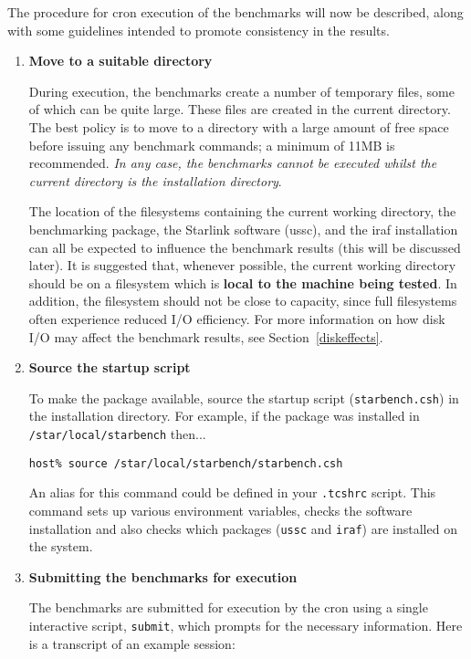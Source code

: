 The procedure for cron execution of the benchmarks will now be described, along
with some guidelines intended to promote consistency in the results. 

\begin{enumerate}

\item {\bf Move to a suitable directory}

During execution, the benchmarks create a number of temporary files,
some of which can be quite large. These files are created in the
current directory. The best policy is to move to a directory with a
large amount of free space before issuing any benchmark commands; a
minimum of 11MB is recommended. {\em In any case, the benchmarks
cannot be executed whilst the current directory is the installation
directory}.

The location of the filesystems containing the current working
directory, the benchmarking package, the Starlink software (ussc), and
the iraf installation can all be expected to influence the benchmark
results (this will be discussed later).  It is suggested that, whenever
possible, the current working directory should be on a filesystem which
is {\bf local to the machine being tested}. In addition, the filesystem
should not be close to capacity, since full filesystems often
experience reduced I/O efficiency. For more information on how disk I/O
may affect the benchmark results, see Section~\ref{diskeffects}.


\item {\bf Source the startup script}

To make the package available, source the startup script ({\tt starbench.csh})
in the installation directory. For example, if the package was installed in
{\tt /star/local/starbench} then...

{\tt host\% source /star/local/starbench/starbench.csh}

An alias for this command could be defined in your {\tt .tcshrc} script. This
command sets up various environment variables, checks the software installation
and also checks which packages ({\tt ussc} and {\tt iraf}) are installed
on the system. 
 

\item {\bf Submitting the benchmarks for execution}

The benchmarks are submitted for execution by the cron using a single
interactive script, {\tt submit}, which prompts for the necessary
information. Here is a transcript of an example session:


\end{enumerate}
